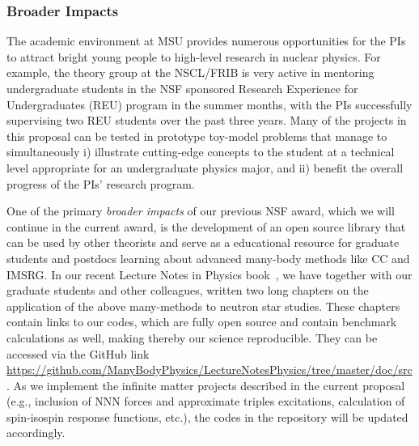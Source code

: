 \documentclass[10pt]{article}
\begin{document}
\subsubsection{Broader Impacts}

The academic environment at MSU provides numerous opportunities for
the PIs to attract bright young people to high-level research in
nuclear physics. For example, the theory group at the NSCL/FRIB is very
active in mentoring undergraduate students in the NSF sponsored
Research Experience for Undergraduates (REU) program in the summer
months, with the PIs successfully supervising two REU students over
the past three years. Many of the projects in this proposal can be
tested in prototype toy-model problems that manage to simultaneously
i) illustrate cutting-edge concepts to the student at a technical
level appropriate for an undergraduate physics major, and ii) benefit
the overall progress of the PIs' research program.

One of the primary \emph{broader impacts} of our previous NSF award,
which we will continue in the current award, is the development of an
open source library that can be used by other theorists and serve as a
educational resource for graduate students and postdocs learning about
advanced many-body methods like CC and IMSRG.  In our recent Lecture
Notes in Physics book~\cite{lnp}, we have together with our graduate
students and other colleagues, written two long chapters on the
application of the above many-methods to neutron star studies. These
chapters contain links to our codes, which are fully open source and
contain benchmark calculations as well, making thereby our science
reproducible. They can be accessed via the GitHub link
\url{https://github.com/ManyBodyPhysics/LectureNotesPhysics/tree/master/doc/src}. As
we implement the infinite matter projects described in the current
proposal (e.g., inclusion of NNN forces and approximate triples
excitations, calculation of spin-isospin response functions, etc.),
the codes in the repository will be updated accordingly.
\end{document}
